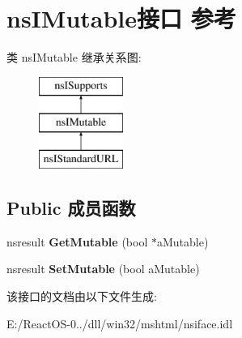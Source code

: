 \hypertarget{interfacens_i_mutable}{}\section{ns\+I\+Mutable接口 参考}
\label{interfacens_i_mutable}
类 ns\+I\+Mutable 继承关系图\+:\begin{figure}[H]
\begin{center}
\leavevmode
\includegraphics[height=3.000000cm]{interfacens_i_mutable}
\end{center}
\end{figure}
\subsection*{Public 成员函数}
\begin{DoxyCompactItemize}
\item 
\mbox{\label{interfacens_i_mutable_aa95f7b700e5f6ae9227c9ada58c3585f}} 
nsresult {\bfseries Get\+Mutable} (bool $\ast$a\+Mutable)
\item 
\mbox{\label{interfacens_i_mutable_a99b8846e6ae711fa4efe5cb0a1826b5a}} 
nsresult {\bfseries Set\+Mutable} (bool a\+Mutable)
\end{DoxyCompactItemize}


该接口的文档由以下文件生成\+:\begin{DoxyCompactItemize}
\item 
E\+:/\+React\+O\+S-\/0../dll/win32/mshtml/nsiface.\+idl\end{DoxyCompactItemize}
